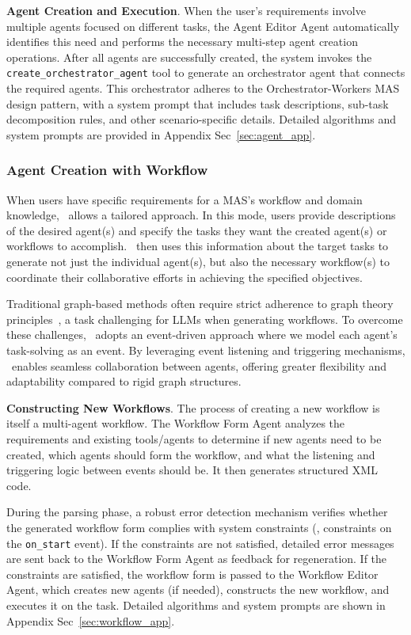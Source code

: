 \noindent \textbf{Agent Creation and Execution}.
When the user's requirements involve multiple agents focused on different tasks, the Agent Editor Agent automatically identifies this need and performs the necessary multi-step agent creation operations. After all agents are successfully created, the system invokes the \texttt{create\_orchestrator\_agent} tool to generate an orchestrator agent that connects the required agents. This orchestrator adheres to the Orchestrator-Workers MAS design pattern, with a system prompt that includes task descriptions, sub-task decomposition rules, and other scenario-specific details. Detailed algorithms and system prompts are provided in Appendix Sec~\ref{sec:agent_app}.

\subsubsection{Agent Creation with Workflow}
When users have specific requirements for a MAS's workflow and domain knowledge, \model\ allows a tailored approach. In this mode, users provide descriptions of the desired agent(s) and specify the tasks they want the created agent(s) or workflows to accomplish. \model\ then uses this information about the target tasks to generate not just the individual agent(s), but also the necessary workflow(s) to coordinate their collaborative efforts in achieving the specified objectives.

Traditional graph-based methods often require strict adherence to graph theory principles~\cite{gptswarm, langchain2023langgraph, ADAS, aflow}, a task challenging for LLMs when generating workflows. To overcome these challenges, \model\ adopts an event-driven approach where we model each agent's task-solving as an event. By leveraging event listening and triggering mechanisms, \model\ enables seamless collaboration between agents, offering greater flexibility and adaptability compared to rigid graph structures. 

\noindent \textbf{Constructing New Workflows}. The process of creating a new workflow is itself a multi-agent workflow. The Workflow Form Agent analyzes the requirements and existing tools/agents to determine if new agents need to be created, which agents should form the workflow, and what the listening and triggering logic between events should be. It then generates structured XML code.

During the parsing phase, a robust error detection mechanism verifies whether the generated workflow form complies with system constraints (\eg, constraints on the \texttt{on\_start} event). If the constraints are not satisfied, detailed error messages are sent back to the Workflow Form Agent as feedback for regeneration. If the constraints are satisfied, the workflow form is passed to the Workflow Editor Agent, which creates new agents (if needed), constructs the new workflow, and executes it on the task. Detailed algorithms and system prompts are shown in Appendix Sec~\ref{sec:workflow_app}.



